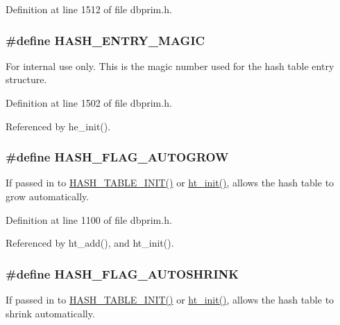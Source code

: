 Definition at line 1512 of file dbprim.h.\hypertarget{group__dbprim__hash_ga37}{
\subsubsection[HASH\_\-ENTRY\_\-MAGIC]{\setlength{\rightskip}{0pt plus 5cm}\#define HASH\_\-ENTRY\_\-MAGIC}}
\label{group__dbprim__hash_ga37}


\begin{Desc}
\item[For internal use only.]
This is the magic number used for the hash table entry structure.\end{Desc}


Definition at line 1502 of file dbprim.h.

Referenced by he\_\-init().\hypertarget{group__dbprim__hash_ga23}{
\subsubsection[HASH\_\-FLAG\_\-AUTOGROW]{\setlength{\rightskip}{0pt plus 5cm}\#define HASH\_\-FLAG\_\-AUTOGROW}}
\label{group__dbprim__hash_ga23}


If passed in to \hyperlink{group__dbprim__hash_ga26}{HASH\_\-TABLE\_\-INIT()} or \hyperlink{group__dbprim__hash_ga10}{ht\_\-init()}, allows the hash table to grow automatically.

Definition at line 1100 of file dbprim.h.

Referenced by ht\_\-add(), and ht\_\-init().\hypertarget{group__dbprim__hash_ga24}{
\subsubsection[HASH\_\-FLAG\_\-AUTOSHRINK]{\setlength{\rightskip}{0pt plus 5cm}\#define HASH\_\-FLAG\_\-AUTOSHRINK}}
\label{group__dbprim__hash_ga24}


If passed in to \hyperlink{group__dbprim__hash_ga26}{HASH\_\-TABLE\_\-INIT()} or \hyperlink{group__dbprim__hash_ga10}{ht\_\-init()}, allows the hash table to shrink automatically.

